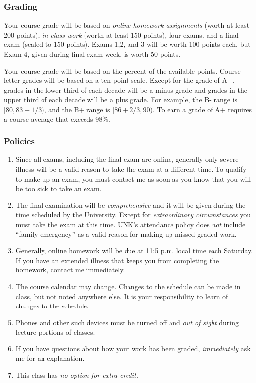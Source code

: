 \documentclass[12pt]{article}
\newcounter{ex}\setcounter{ex}{0}
\begin{document}
\subsubsection*{Grading}

Your course grade will be based on \emph{online homework assignments} (worth at least 200 points), \emph{in-class work} (worth at least 150 points),  four exams, and a final
exam (scaled to 150 points).   Exams 1,2, and 3 will be worth 100 points each, but Exam 4, given during final exam week, is worth 50 points.

Your course grade will be based on the percent of the available points. Course letter grades will be based on a ten point scale. Except for the grade of A+, grades in the lower third of each decade will be a
minus grade and grades in the upper third of each decade will be a plus grade. For example, the B- range is $[80, 83 + 1/3)$, and the B+ range is $[86 + 2/3, 90)$. To earn a grade of A+ requires a course average that exceeds 98\%.


\subsubsection* {Policies}

\begin{enumerate}


 \item Since all  exams, including the final exam are online, generally only severe  illness will be a valid reason to take the exam at a different time. To qualify to make up an exam, you must contact me as soon as you know that you will be too sick to take an exam.

 \item The final examination will be \emph{comprehensive} and it will be given during the time scheduled by the University. Except for \emph{extraordinary circumstances}
you must take the exam at this time.   UNK's attendance policy  does \emph{not} include ``family emergency'' as a valid reason for making up missed graded work.


 \item Generally, online homework will be due at 11:5 p.m. local time each Saturday. If you have an extended illness that keeps you from completing the homework, contact me immediately.


\item The course calendar may change. Changes to the schedule can be made in class, but not noted anywhere else. It is your responsibility to
learn of changes to the schedule.

\item Phones and other such devices must be turned off and \emph{out of sight} during lecture portions of classes.


\item If you have questions about how your work has been graded,  \emph{immediately}  ask me for an explanation.

\item This class has \emph{no option for extra credit.}

\end{enumerate}
\end{document}
